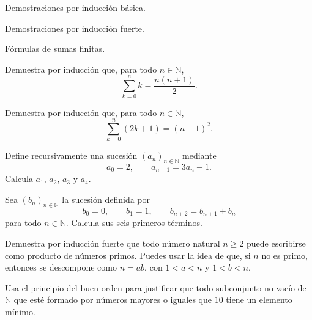 \begin{seminario}
  \item Demostraciones por inducción básica.
  \item Demostraciones por inducción fuerte.
  \item Fórmulas de sumas finitas.
\end{seminario}

\begin{ejerciciospropuestos}
  \item Demuestra por inducción que, para todo \(n\in\mathbb{N}\),
  \[
    \sum_{k=0}^{n} k=\frac{n(n+1)}{2}.
  \]

  \item Demuestra por inducción que, para todo \(n\in\mathbb{N}\),
  \[
    \sum_{k=0}^{n} (2k+1)=(n+1)^2.
  \]

  \item Define recursivamente una sucesión \((a_n)_{n\in\mathbb{N}}\) mediante
  \[
    a_0=2,
    \qquad
    a_{n+1}=3a_n-1.
  \]
  Calcula \(a_1\), \(a_2\), \(a_3\) y \(a_4\).

  \item Sea \((b_n)_{n\in\mathbb{N}}\) la sucesión definida por
  \[
    b_0=0,
    \qquad
    b_1=1,
    \qquad
    b_{n+2}=b_{n+1}+b_n
  \]
  para todo \(n\in\mathbb{N}\). Calcula sus seis primeros términos.

  \item Demuestra por inducción fuerte que todo número natural \(n\geq 2\) puede escribirse como producto de números primos. Puedes usar la idea de que, si \(n\) no es primo, entonces se descompone como \(n=ab\), con \(1<a<n\) y \(1<b<n\).

  \item Usa el principio del buen orden para justificar que todo subconjunto no vacío de \(\mathbb{N}\) que esté formado por números mayores o iguales que \(10\) tiene un elemento mínimo.
\end{ejerciciospropuestos}


